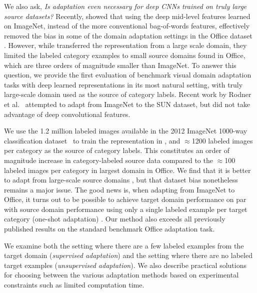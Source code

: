 We also ask, \textit{Is adaptation even necessary for deep CNNs trained on truly large source datasets?}
Recently, \cite{deeplearning-arxiv-2013} showed that using the deep mid-level features learned on ImageNet, instead of the more conventional bag-of-words features, effectively removed the bias in some of the domain adaptation settings in the Office dataset \cite{saenko-eccv10}.
However, while \cite{deeplearning-arxiv-2013} transferred the representation from a large scale domain, they limited the labeled category examples to small source domains found in Office, 
which are three orders of magnitude smaller than ImageNet. 
To answer this question, we provide the first evaluation of benchmark visual domain adaptation tasks with deep learned representations in its most natural setting, with truly large-scale domain used as the source of category labels.
Recent work by Rodner et al.~\cite{rodner-arxiv13} attempted to adapt from ImageNet to the SUN dataset, but did not take advantage of deep convolutional features. 

We use the 1.2 million
labeled images available in the 2012 ImageNet 1000-way classification
dataset~\cite{ilsvrc2012} to train the representation in \cite{supervision}, and  $\approx$1200 labeled images per category as the source of category labels.
This constitutes an order of magnitude increase in category-labeled source data compared to the  $\approx$100 labeled images per category in largest domain in Office.  We find that it is better to adapt from large-scale source domains , but that dataset bias nonetheless remains a major issue.
The good news is, when adapting
from ImageNet to Office, it turns out to be possible to achieve target domain
performance on par with source domain performance using only a single labeled
example per target category (one-shot adaptation) .  Our method also exceeds all previously published
results on the standard benchmark Office adaptation task.

We examine both the setting where there are a few labeled examples from the target domain (\emph{supervised adaptation}) and the setting where there are no labeled target examples (\emph{unsupervised adaptation}). We also describe practical solutions for choosing between the various adaptation methods based on experimental constraints such as limited computation time. 
